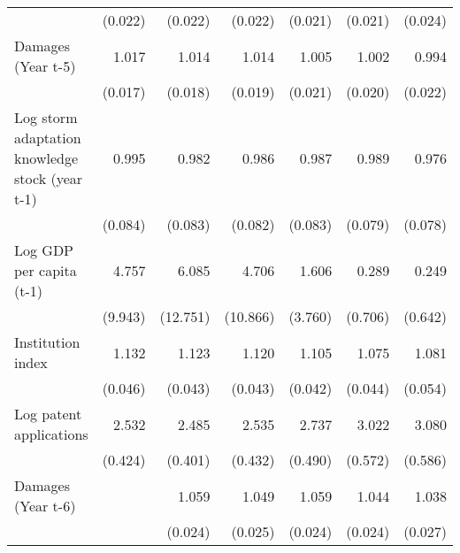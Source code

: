 \begin{table}[htbp]
\begin{tabular}{l*{6}{D{.}{.}{-1}}}
                    &     (0.022)         &     (0.022)         &     (0.022)         &     (0.021)         &     (0.021)         &     (0.024)         \\
\addlinespace
Damages (Year t-5)  &       1.017         &       1.014         &       1.014         &       1.005         &       1.002         &       0.994         \\
                    &     (0.017)         &     (0.018)         &     (0.019)         &     (0.021)         &     (0.020)         &     (0.022)         \\
\addlinespace
Log storm adaptation knowledge stock (year t-1)&       0.995         &       0.982         &       0.986         &       0.987         &       0.989         &       0.976         \\
                    &     (0.084)         &     (0.083)         &     (0.082)         &     (0.083)         &     (0.079)         &     (0.078)         \\
\addlinespace
Log GDP per capita (t-1)&       4.757         &       6.085         &       4.706         &       1.606         &       0.289         &       0.249         \\
                    &     (9.943)         &    (12.751)         &    (10.866)         &     (3.760)         &     (0.706)         &     (0.642)         \\
\addlinespace
Institution index   &       1.132\sym{***}&       1.123\sym{***}&       1.120\sym{***}&       1.105\sym{***}&       1.075\sym{*}  &       1.081\sym{\%}  \\
                    &     (0.046)         &     (0.043)         &     (0.043)         &     (0.042)         &     (0.044)         &     (0.054)         \\
\addlinespace
Log patent applications&       2.532\sym{***}&       2.485\sym{***}&       2.535\sym{***}&       2.737\sym{***}&       3.022\sym{***}&       3.080\sym{***}\\
                    &     (0.424)         &     (0.401)         &     (0.432)         &     (0.490)         &     (0.572)         &     (0.586)         \\
\addlinespace
Damages (Year t-6)  &                     &       1.059\sym{**} &       1.049\sym{**} &       1.059\sym{**} &       1.044\sym{*}  &       1.038\sym{\%}  \\
                    &                     &     (0.024)         &     (0.025)         &     (0.024)         &     (0.024)         &     (0.027)         \\

\end{tabular}
\end{table}
